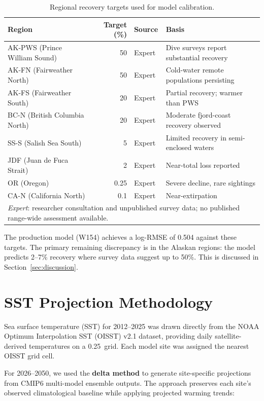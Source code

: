 \begin{table}[ht]
\centering
\caption{Regional recovery targets used for model calibration.}
\label{tab:targets}
\begin{tabular}{lrll}
\toprule
\textbf{Region} & \textbf{Target (\%)} & \textbf{Source} & \textbf{Basis} \\
\midrule
AK-PWS (Prince William Sound) & 50 & Expert & Dive surveys report substantial recovery \\
AK-FN (Fairweather North) & 50 & Expert & Cold-water remote populations persisting \\
AK-FS (Fairweather South) & 20 & Expert & Partial recovery; warmer than PWS \\
BC-N (British Columbia North) & 20 & Expert & Moderate fjord-coast recovery observed \\
SS-S (Salish Sea South) & 5 & Expert & Limited recovery in semi-enclosed waters \\
JDF (Juan de Fuca Strait) & 2 & Expert & Near-total loss reported \\
OR (Oregon) & 0.25 & Expert & Severe decline, rare sightings \\
CA-N (California North) & 0.1 & Expert & Near-extirpation \\
\bottomrule
\multicolumn{4}{l}{\footnotesize \textit{Expert}: researcher consultation and unpublished survey data; no published range-wide assessment available.} \\
\end{tabular}
\end{table}

The production model (W154) achieves a log-RMSE of 0.504 against these targets. The primary remaining discrepancy is in the Alaskan regions: the model predicts 2--7\% recovery where survey data suggest up to 50\%. This is discussed in Section~\ref{sec:discussion}.

\clearpage
\section{SST Projection Methodology}
\label{sec:appendix_sst}

Sea surface temperature (SST) for 2012--2025 was drawn directly from the NOAA Optimum Interpolation SST (OISST) v2.1 dataset, providing daily satellite-derived temperatures on a 0.25\textdegree\ grid. Each model site was assigned the nearest OISST grid cell.

For 2026--2050, we used the \textbf{delta method} to generate site-specific projections from CMIP6 multi-model ensemble outputs. The approach preserves each site's observed climatological baseline while applying projected warming trends:

